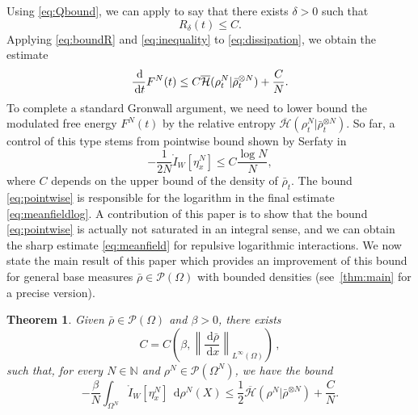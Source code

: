 \documentclass[a4paper,10pt,twoside]{amsart}
\newcommand{\dx}[1]{\,\mathrm{d}#1}  %
\newtheorem{theorem}{Theorem}[section]
\theoremstyle{remark}
\theoremstyle{definition}
\numberwithin{equation}{section}
\newcommand{\N}{\mathbb{N}}
\newcommand{\cP}{\mathcal{P}}
\newcommand{\0}{{\bf 0}}
\newcommand{\+}{\hspace{-.5ex}+\hspace{-.5ex}}
\begin{document}
Using \eqref{eq:Qbound}, we can apply \cite[Theorem 4]{Jabin2016} to say that there exists $\delta>0$ such that
\begin{equation}\label{eq:boundR}
  R_\delta(t)\le C.
\end{equation}
Applying \eqref{eq:boundR} and \eqref{eq:inequality} to \eqref{eq:dissipation}, we obtain the estimate
\begin{equation}\label{eq:dissipation2}
  \frac{\dx}{\dx{t}}F^N(t)\le C\overline{\mathcal{H}}(\rho^N_t|\bar\rho^{\otimes N}_t) +\frac{C}{N}.
\end{equation}
To complete a standard Gronwall argument, we need to lower bound the modulated free energy $F^N(t)$ by the relative entropy $\overline{\mathcal{H}}(\rho^N_t|\bar\rho^{\otimes N}_t)$. So far, a control of this type stems from pointwise bound shown by Serfaty in \cite[Corollary 3.5]{serfaty2020mean}
\begin{equation}\label{eq:pointwise}
  -\frac{1}{2N}\mathring{I}_W[\eta^N_x]\le C \frac{\log N}{N},
\end{equation}
where $C$ depends on the upper bound of the density of $\bar{\rho}_t$. The bound \eqref{eq:pointwise} is responsible for the logarithm in the final estimate \eqref{eq:meanfieldlog}. A contribution of this paper is to show that the bound \eqref{eq:pointwise} is actually not saturated in an integral sense, and we can obtain the sharp estimate \eqref{eq:meanfield} for repulsive logarithmic interactions. We now state the main result of this paper which provides an improvement of this bound for general base measures $\bar{\rho}\in \cP(\Omega)$ with bounded densities (see~\cref{thm:main} for a precise version).
\begin{theorem}\label{lem:energybound}
 Given $\bar\rho\in\mathcal{P}(\Omega)$ and $\beta>0$, there exists 
 \[
   C=C\left(\beta,\left \lVert \frac{\dx{\bar{\rho}}}{\dx{x}} \right \rVert_{L^\infty(\Omega)}\right) \, ,
 \] 
 such that,  for every $N\in\N$ and $\rho^N\in\mathcal{P}(\Omega^N)$, we have the bound
\begin{equation}\label{eq:integral}
  -\frac{\beta}{N}\int_{\Omega^N}\mathring{I}_W[\eta^N_x]\;\dx \rho^N(X)\le \frac{1}{2}\overline{\mathcal{H}}(\rho^N|\bar\rho^{\otimes N})+\frac{C}{N}.
\end{equation}
\end{theorem}
\end{document}
